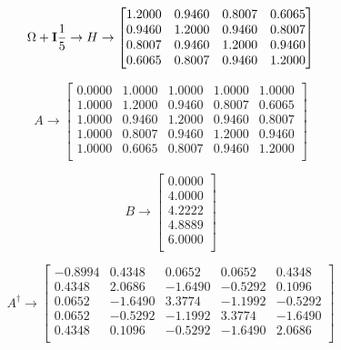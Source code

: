 \begin{equation}
  \Omega+\vb{I}\frac{1}{5}\to H\to
  \begin{bmatrix}
    1.2000 & 0.9460 & 0.8007 & 0.6065 \\
    0.9460 & 1.2000 & 0.9460 & 0.8007 \\
    0.8007 & 0.9460 & 1.2000 & 0.9460 \\
    0.6065 & 0.8007 & 0.9460 & 1.2000 \\
  \end{bmatrix}
\end{equation}

\begin{equation}
  A\to
  \begin{bmatrix}
    0.0000 & 1.0000 & 1.0000 & 1.0000 & 1.0000 \\
    1.0000 & 1.2000 & 0.9460 & 0.8007 & 0.6065 \\
    1.0000 & 0.9460 & 1.2000 & 0.9460 & 0.8007 \\
    1.0000 & 0.8007 & 0.9460 & 1.2000 & 0.9460 \\
    1.0000 & 0.6065 & 0.8007 & 0.9460 & 1.2000 \\
  \end{bmatrix}
\end{equation}

\begin{equation}
  B\to
  \begin{bmatrix}
    0.0000 \\
    4.0000 \\
    4.2222 \\
    4.8889 \\
    6.0000 \\
  \end{bmatrix}
\end{equation}

\begin{equation}
  A^{\dag}\to
  \begin{bmatrix}
    -0.8994 & 0.4348  & 0.0652  & 0.0652  & 0.4348  \\
    0.4348  & 2.0686  & -1.6490 & -0.5292 & 0.1096  \\
    0.0652  & -1.6490 & 3.3774  & -1.1992 & -0.5292 \\
    0.0652  & -0.5292 & -1.1992 & 3.3774  & -1.6490 \\
    0.4348  & 0.1096  & -0.5292 & -1.6490 & 2.0686  \\
  \end{bmatrix}
\end{equation}

